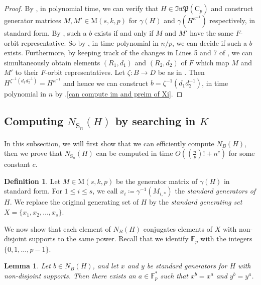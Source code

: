 \documentclass[11pt,a4paper]{article}
\newtheorem{lemma}[theorem]{Lemma}
\theoremstyle{definition}
\newtheorem{definition}[theorem]{Definition}
\theoremstyle{remark}
\newcommand{\InP}{\mathfrak{InP}}
\newcommand{\Sy}{\mathrm{S}}
\newcommand{\Cy}{\mathrm{C}}
\begin{document}
\begin{proof}
By , in polynomial time, we can verify that $H \in \InP(\Cy_p)$ and construct generator matrices $M, M' \in \mathrm{M}(s, k, p)$ for $\gamma(H)$ and $\gamma(H^{\kappa^{-1}})$ respectively, in standard form. 
By , such a $b$ exists if and only if $M$ and $M'$ have the same $F$-orbit representative. So by , in time polynomial in $n/p$, we can decide if such a $b$ exists. Furthermore, 
by keeping track of the changes in Lines 5 and 7 of , we can simultaneously obtain elements $(R_1, d_1)$ and $(R_2, d_2)$ of $F$ which map $M$ and $M'$ to their $F$-orbit representatives. 
Let $\zeta: B \rightarrow D$ be as in .
Then $H^{\zeta^{-1}(d_1d_2^{-1})} = H^{\kappa^{-1}}$ and hence we can construct $b = \zeta^{-1}(d_1d_2^{-1})$, in time polynomial in $n$ by .\ref{can compute im and preim of Xi}.  
\end{proof}



\subsection{Computing \texorpdfstring{$N_{\Sy_n}(H)$}{NSn(H)} by searching in \texorpdfstring{$K$}{K}}
\label{subsection: normFixingOrbs}


In this subsection, we will first show that we can efficiently compute $N_{B}(H)$, then we prove that $N_{\Sy_n}(H)$ can be computed in time $O((\frac{n}{p})! + n^c)$ for some constant $c$. 

\begin{definition} \label{notation: M and X}
Let $M \in \mathrm{M}(s,k, p)$ be the generator matrix of $\gamma(H)$ in standard form. 
For $1 \leq i \leq {s}$, we call $x_i \coloneqq  \gamma^{-1}(M_{i,*})$ the \emph{standard generators of $H$}. We replace the original generating set of $H$ by the \emph{standard generating set} $X = \{x_1, x_2, \ldots, x_s \}$. 
\end{definition}

We now show that each element of $N_B(H)$ conjugates elements of $X$ with non-disjoint supports to the same power. Recall that we identify $\mathds{F}_p$ with the integers $\{0,1, \ldots, p-1\}$. 
 

\begin{lemma} \label{mathcalN sends gens to same power if supp intersects}
Let $b \in N_{B}(H)$, and let $x$ and $y$ be standard generators for $H$ with non-disjoint supports. 
Then there exists an $a \in \mathds{F}_p^*$ such that $x^{b} = x^a$ and $y^{b} = y^a$. 
\end{lemma}
\end{document}

